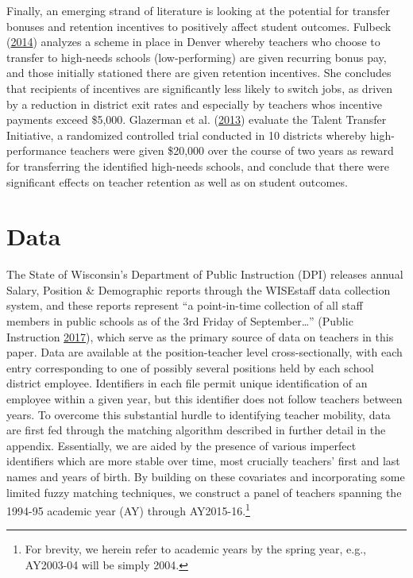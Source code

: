 \documentclass[12pt,]{article}
\let\rmarkdownfootnote\footnote%
\def\footnote{\protect\rmarkdownfootnote}
\begin{document}
Finally, an emerging strand of literature is looking at the potential
for transfer bonuses and retention incentives to positively affect
student outcomes. Fulbeck (\protect\hyperlink{ref-fulbeck}{2014})
analyzes a scheme in place in Denver whereby teachers who choose to
transfer to high-needs schools (low-performing) are given recurring
bonus pay, and those initially stationed there are given retention
incentives. She concludes that recipients of incentives are
significantly less likely to switch jobs, as driven by a reduction in
district exit rates and especially by teachers whos incentive payments
exceed \$5,000. Glazerman et al.
(\protect\hyperlink{ref-glazerman}{2013}) evaluate the Talent Transfer
Initiative, a randomized controlled trial conducted in 10 districts
whereby high-performance teachers were given \$20,000 over the course of
two years as reward for transferring the identified high-needs schools,
and conclude that there were significant effects on teacher retention as
well as on student outcomes.

\section{Data}\label{data}

The State of Wisconsin's Department of Public Instruction (DPI) releases
annual Salary, Position \& Demographic reports through the WISEstaff
data collection system, and these reports represent ``a point-in-time
collection of all staff members in public schools as of the 3rd Friday
of September\ldots{}'' (Public Instruction
\protect\hyperlink{ref-dpi}{2017}), which serve as the primary source of
data on teachers in this paper. Data are available at the
position-teacher level cross-sectionally, with each entry corresponding
to one of possibly several positions held by each school district
employee. Identifiers in each file permit unique identification of an
employee within a given year, but this identifier does not follow
teachers between years. To overcome this substantial hurdle to
identifying teacher mobility, data are first fed through the matching
algorithm described in further detail in the appendix. Essentially, we
are aided by the presence of various imperfect identifiers which are
more stable over time, most crucially teachers' first and last names and
years of birth. By building on these covariates and incorporating some
limited fuzzy matching techniques, we construct a panel of teachers
spanning the 1994-95 academic year (AY) through AY2015-16.\footnote{For
  brevity, we herein refer to academic years by the spring year, e.g.,
  AY2003-04 will be simply 2004.}
\end{document}
